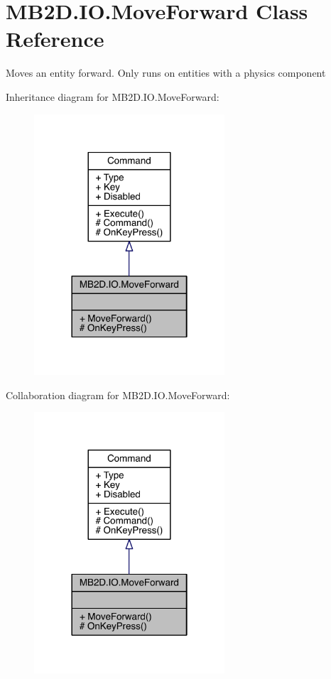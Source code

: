 \hypertarget{class_m_b2_d_1_1_i_o_1_1_move_forward}{}\section{M\+B2\+D.\+I\+O.\+Move\+Forward Class Reference}
\label{class_m_b2_d_1_1_i_o_1_1_move_forward}


Moves an entity forward. Only runs on entities with a physics component  




Inheritance diagram for M\+B2\+D.\+I\+O.\+Move\+Forward\+:\nopagebreak
\begin{figure}[H]
\begin{center}
\leavevmode
\includegraphics[width=201pt]{class_m_b2_d_1_1_i_o_1_1_move_forward__inherit__graph}
\end{center}
\end{figure}


Collaboration diagram for M\+B2\+D.\+I\+O.\+Move\+Forward\+:\nopagebreak
\begin{figure}[H]
\begin{center}
\leavevmode
\includegraphics[width=201pt]{class_m_b2_d_1_1_i_o_1_1_move_forward__coll__graph}
\end{center}
\end{figure}
